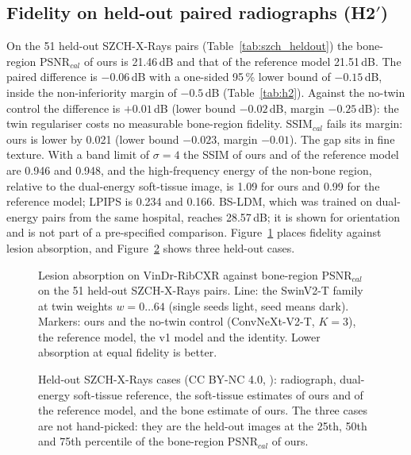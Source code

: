 \subsection{Fidelity on held-out paired radiographs (\texorpdfstring{H2$'$}{H2'})}
On the 51 held-out SZCH-X-Rays pairs (Table~\ref{tab:szch_heldout}) the bone-region PSNR$_{cal}$ of ours is 21.46\,dB and that of the
reference model 21.51\,dB. The paired difference is $-0.06$\,dB with a one-sided 95\,\% lower bound of $-0.15$\,dB, inside the
non-inferiority margin of $-0.5$\,dB (Table~\ref{tab:h2}). Against the no-twin control the difference is $+0.01$\,dB (lower bound
$-0.02$\,dB, margin $-0.25$\,dB): the twin regulariser costs no measurable bone-region fidelity. SSIM$_{cal}$ fails its margin: ours is
lower by 0.021 (lower bound $-0.023$, margin $-0.01$). The gap sits in fine texture. With a band limit of $\sigma=4$ the SSIM of ours and of
the reference model are 0.946 and 0.948, and the high-frequency energy of the non-bone region, relative to the dual-energy soft-tissue image,
is 1.09 for ours and 0.99 for the reference model; LPIPS is 0.234 and 0.166. BS-LDM, which was trained on dual-energy pairs from the same
hospital, reaches 28.57\,dB; it is shown for orientation and is not part of a pre-specified comparison. Figure~\ref{fig:pareto} places
fidelity against lesion absorption, and Figure~\ref{fig:qualitative} shows three held-out cases.
\begin{table}[htbp]
\centering\small
\caption{Held-out SZCH-X-Rays pairs: bone-region and whole-image metrics for ours and the comparators, calibrated (primary) and raw. HF
ratio: high-frequency energy of the non-bone region relative to the dual-energy soft-tissue image (1 = equal).}
\label{tab:szch_heldout}
\end{table}
\begin{table}[htbp]
\centering\small
\caption{H2$'$ non-inferiority on the 51 held-out SZCH-X-Rays pairs (paired differences, image bootstrap, one-sided 95\,\% lower bound).}
\label{tab:h2}
\end{table}
\begin{figure}[htbp]
\centering
{}
\caption{Lesion absorption on VinDr-RibCXR against bone-region PSNR$_{cal}$ on the 51 held-out SZCH-X-Rays pairs. Line: the SwinV2-T family at
twin weights $w=0\ldots64$ (single seeds light, seed means dark). Markers: ours and the no-twin control (ConvNeXt-V2-T, $K=3$), the reference
model, the v1 model and the identity. Lower absorption at equal fidelity is better.}
\label{fig:pareto}
\end{figure}
\begin{figure}[htbp]
\centering
{}
\caption{Held-out SZCH-X-Rays cases (CC BY-NC 4.0, \citealp{sun2026bsldm}): radiograph, dual-energy soft-tissue reference, the soft-tissue
estimates of ours and of the reference model, and the bone estimate of ours. The three cases are not hand-picked: they are the held-out images at
the 25th, 50th and 75th percentile of the bone-region PSNR$_{cal}$ of ours.}
\label{fig:qualitative}
\end{figure}

